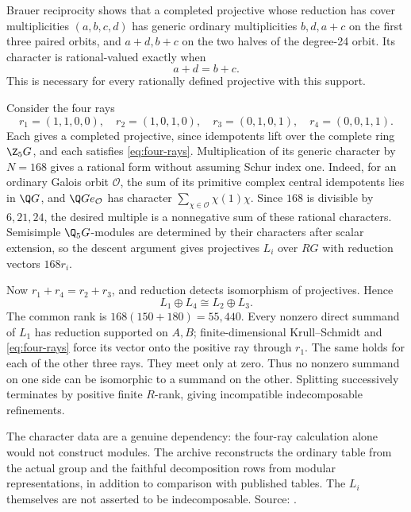 Brauer reciprocity shows that a completed projective
whose reduction has cover multiplicities \((a,b,c,d)\)
has generic ordinary multiplicities \(b,d,a+c\) on
the first three paired orbits, and \(a+d,b+c\) on
the two halves of the degree-24 orbit. Its character
is rational-valued exactly when
\begin{equation}\label{eq:four-rays}
 a+d=b+c.
\end{equation}
This is necessary for every rationally defined
projective with this support.

Consider the four rays
\[
 r_1=(1,1,0,0),\quad r_2=(1,0,1,0),\quad
 r_3=(0,1,0,1),\quad r_4=(0,0,1,1).
\]
Each gives a completed projective, since idempotents
lift over the complete ring \(\Z_5G\), and each
satisfies \eqref{eq:four-rays}. Multiplication of
its generic character by \(N=168\) gives a rational
form without assuming Schur index one. Indeed, for
an ordinary Galois orbit \(\mathcal O\), the sum
of its primitive complex central idempotents lies
in \(\Q G\), and \(\Q Ge_{\mathcal O}\) has character
\(\sum_{\chi\in\mathcal O}\chi(1)\chi\).
Since \(168\) is divisible by \(6,21,24\), the
desired multiple is a nonnegative sum of these
rational characters. Semisimple \(\Q_5G\)-modules
are determined by their characters after scalar
extension, so the descent argument gives projectives
\(L_i\) over \(RG\) with reduction vectors \(168r_i\).

Now \(r_1+r_4=r_2+r_3\), and reduction detects
isomorphism of projectives. Hence
\[
 L_1\oplus L_4\cong L_2\oplus L_3.
\]
The common rank is \(168(150+180)=55{,}440\).
Every nonzero direct summand of \(L_1\) has reduction
supported on \(A,B\); finite-dimensional
Krull--Schmidt and \eqref{eq:four-rays} force its
vector onto the positive ray through \(r_1\).
The same holds for each of the other three rays.
They meet only at zero. Thus no nonzero summand
on one side can be isomorphic to a summand on
the other. Splitting successively terminates by
positive finite \(R\)-rank, giving incompatible
indecomposable refinements.

The character data are a genuine dependency: the
four-ray calculation alone would not construct
modules. The archive reconstructs the ordinary
table from the actual group and the faithful
decomposition rows from modular representations,
in addition to comparison with published tables.
The \(L_i\) themselves are not asserted to be
indecomposable. Source:
.


